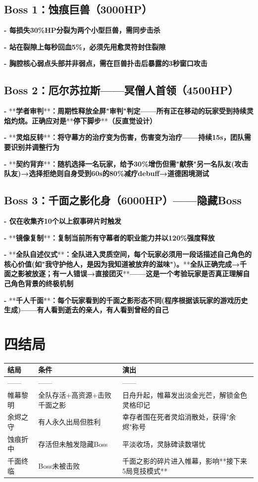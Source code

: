 \documentclass[12pt,a4paper,openany]{ctexbook}
\begin{document}
\subsection*{Boss 1：蚀痕巨兽（3000HP）}

\textbf{- 每损失30\%HP分裂为两个小型巨兽，需同步击杀}

\textbf{- 站在裂隙上每秒回血5\%，必须先用愈灵符封住裂隙}

\textbf{- 胸腔核心弱点头部并非弱点，需在巨兽扑击后暴露的3秒窗口攻击}


\subsection*{Boss 2：厄尔苏拉斯——冥僧人首领（4500HP）}

\textbf{- }**\textbf{学者审判}**\textbf{：周期性释放全屏"审判"判定——所有正在移动的玩家受到持续灵焰灼烧。正确应对是}**\textbf{停下脚步}**\textbf{（反直觉设计）}

\textbf{- }**\textbf{灵焰反转}**\textbf{：将守幕方的治疗变为伤害，伤害变为治疗——持续15s，团队需要识别并调整行为}

\textbf{- }**\textbf{契约背弃}**\textbf{：随机选择一名玩家，给予30\%增伤但需"献祭"另一名队友(攻击队友)→选择拒绝则自身受到60s的80\%减疗debuff→道德困境测试}


\subsection*{Boss 3：千面之影化身（6000HP）——隐藏Boss}

\textbf{- 仅在收集齐10个以上叙事碎片时触发}

\textbf{- }**\textbf{镜像复制}**\textbf{：复制当前所有守幕者的职业能力并以120\%强度释放}

\textbf{- }**\textbf{全队自述仪式}**\textbf{：全队进入灵质空间，每个玩家必须用一段话描述自己角色的核心价值(如"我守护他人，是因为我知道被放弃的滋味")。}**\textbf{全队正确完成→千面之影被放逐；有一人错误→直接团灭}**\textbf{——这是一个考验玩家是否真正理解自己角色背景的终极机制}

\textbf{- }**\textbf{千人千面}**\textbf{：每个玩家看到的千面之影形态不同(程序根据该玩家的游戏历史生成)——有人看到逝去的亲人，有人看到曾经的自己}


\section*{四结局}


\begin{tabular}{|l|l|l|}
\hline
结局 & 条件 & 演出 \\
\hline
------ & ------ & ------ \\
帷幕黎明 & 全队存活+高资源+击败千面之影 & 日舟升起，帷幕发出淡金光芒，解锁金色灵格印记 \\
余烬之守 & 有人永久出局但胜利 & 幸存者围在死者灵焰消散处，获得"余烬"称号 \\
蚀痕折中 & 存活但未触发隐藏Boss & 平淡收场，灵脉碑读数堪忧 \\
千面终临 & Boss未被击败 & 千面之影的碎片进入帷幕，影响**接下来5局竞技模式** \\
\hline
\end{tabular}
\end{document}
